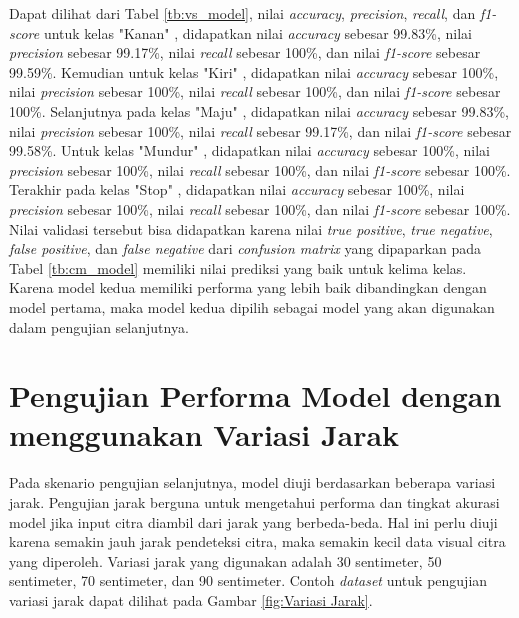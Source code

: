 Dapat dilihat dari Tabel \ref{tb:vs_model}, nilai \emph{accuracy}, \emph{precision}, \emph{recall}, dan \emph{f1-score} untuk kelas "Kanan" , didapatkan nilai \emph{accuracy} sebesar 99.83\%, nilai \emph{precision} sebesar 99.17\%, nilai \emph{recall} sebesar 100\%, dan nilai \emph{f1-score} sebesar 99.59\%. Kemudian untuk kelas "Kiri" , didapatkan nilai \emph{accuracy} sebesar 100\%, nilai \emph{precision} sebesar 100\%, nilai \emph{recall} sebesar 100\%, dan nilai \emph{f1-score} sebesar 100\%. Selanjutnya pada kelas "Maju" , didapatkan nilai \emph{accuracy} sebesar 99.83\%, nilai \emph{precision} sebesar 100\%, nilai \emph{recall} sebesar 99.17\%, dan nilai \emph{f1-score} sebesar 99.58\%. Untuk kelas "Mundur" , didapatkan nilai \emph{accuracy} sebesar 100\%, nilai \emph{precision} sebesar 100\%, nilai \emph{recall} sebesar 100\%, dan nilai \emph{f1-score} sebesar 100\%. Terakhir pada kelas "Stop" , didapatkan nilai \emph{accuracy} sebesar 100\%, nilai \emph{precision} sebesar 100\%, nilai \emph{recall} sebesar 100\%, dan nilai \emph{f1-score} sebesar 100\%. Nilai validasi tersebut bisa didapatkan karena nilai \emph{true positive}, \emph{true negative}, \emph{false positive}, dan \emph{false negative} dari \emph{confusion matrix} yang dipaparkan pada Tabel \ref{tb:cm_model} memiliki nilai prediksi yang baik untuk kelima kelas. Karena model kedua memiliki performa yang lebih baik dibandingkan dengan model pertama, maka model kedua dipilih sebagai model yang akan digunakan dalam pengujian selanjutnya.

\section{Pengujian Performa Model dengan menggunakan Variasi Jarak}

Pada skenario pengujian selanjutnya, model diuji berdasarkan beberapa variasi jarak. Pengujian jarak berguna untuk mengetahui performa dan tingkat akurasi model jika input citra diambil dari jarak yang berbeda-beda. Hal ini perlu diuji karena semakin jauh jarak pendeteksi citra, maka semakin kecil data visual citra yang diperoleh. Variasi jarak yang digunakan adalah 30 sentimeter, 50 sentimeter, 70 sentimeter, dan 90 sentimeter. Contoh \emph{dataset} untuk pengujian variasi jarak dapat dilihat pada Gambar \ref{fig:Variasi Jarak}.

